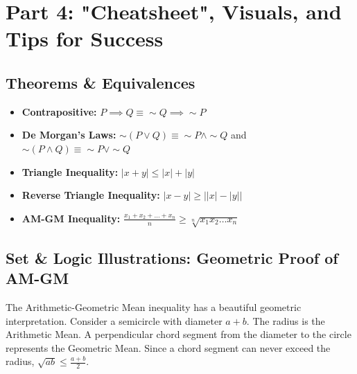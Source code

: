 \documentclass[11pt]{article}
\newcommand{\abs}[1]{\left|#1\right|}
\begin{document}
\newpage
\section{Part 4: "Cheatsheet", Visuals, and Tips for Success}

\subsection{Theorems \& Equivalences}
\begin{itemize}
    \item \textbf{Contrapositive:} $P \implies Q \equiv \sim Q \implies \sim P$
    \item \textbf{De Morgan's Laws:} $\sim(P \lor Q) \equiv \sim P \land \sim Q$ \quad and \quad $\sim(P \land Q) \equiv \sim P \lor \sim Q$
    \item \textbf{Triangle Inequality:} $\abs{x + y} \le \abs{x} + \abs{y}$
    \item \textbf{Reverse Triangle Inequality:} $\abs{x - y} \ge \abs{\abs{x} - \abs{y}}$
    \item \textbf{AM-GM Inequality:} $\frac{x_1 + x_2 + \dots + x_n}{n} \ge \sqrt[n]{x_1 x_2 \dots x_n}$
\end{itemize}

\subsection{Set \& Logic Illustrations: Geometric Proof of AM-GM}
The Arithmetic-Geometric Mean inequality has a beautiful geometric interpretation. Consider a semicircle with diameter $a+b$. The radius is the Arithmetic Mean. A perpendicular chord segment from the diameter to the circle represents the Geometric Mean. Since a chord segment can never exceed the radius, $\sqrt{ab} \le \frac{a+b}{2}$.
\end{document}
